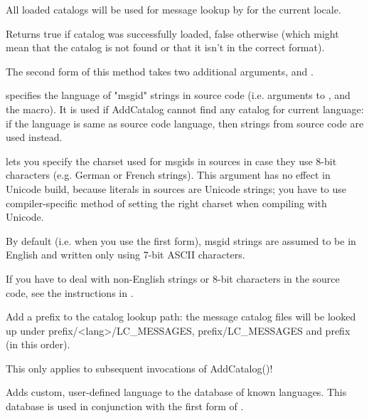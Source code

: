 All loaded catalogs will be used for message lookup by
 for the current locale.

Returns true if catalog was successfully loaded, false otherwise (which might
mean that the catalog is not found or that it isn't in the correct format).

The second form of this method takes two additional arguments,
 and .

 specifies the language of "msgid" strings in source code
(i.e. arguments to ,
 and the 
 macro). It is used if AddCatalog cannot find any
catalog for current language: if the language is same as source code language,
then strings from source code are used instead. 

 lets you specify the charset used for msgids in sources
in case they use 8-bit characters (e.g. German or French strings).  This
argument has no effect in Unicode build, because literals in sources are
Unicode strings; you have to use compiler-specific method of setting the right
charset when compiling with Unicode.

By default (i.e. when you use the first form), msgid strings are assumed
to be in English and written only using 7-bit ASCII characters.

If you have to deal with non-English strings or 8-bit characters in the source
code, see the instructions in 
.


\label{wxlocaleaddcataloglookuppathprefix}


Add a prefix to the catalog lookup path: the message catalog files will be
looked up under prefix/<lang>/LC\_MESSAGES, prefix/LC\_MESSAGES and prefix
(in this order).

This only applies to subsequent invocations of AddCatalog()!


\label{wxlocaleaddlanguage}


Adds custom, user-defined language to the database of known languages. This
database is used in conjunction with the first form of 
. 

